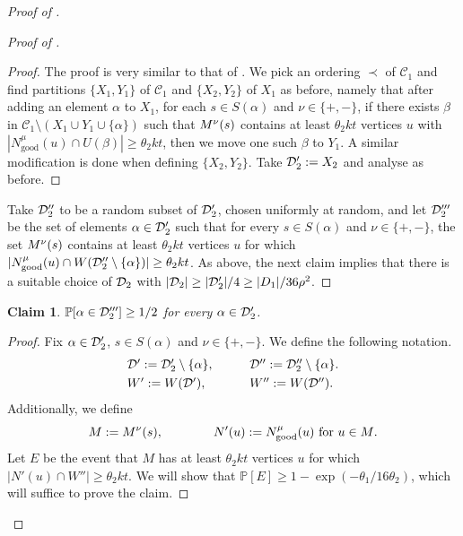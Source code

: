 \documentclass[english]{article}
\theoremstyle{plain}
\newtheorem{claim}[theorem]{Claim}
\theoremstyle{remark}
\def\C{\mathcal{C}}
\def \Nmu{N^{\mu}_{\good}}
\renewcommand{\Pr}{\mathbb{P}}
\DeclareMathOperator{\good}{good}
\begin{document}
\begin{proof}[Proof of ]
\begin{proof}[Proof of ]
				\begin{proof}
					The proof is very similar to that of . We pick an ordering $\prec$ of $\C_1$ and find partitions $\{X_1, Y_1\}$ of $\C_1$ and $\{X_2, Y_2\}$ of $X_1$ as before, namely that after adding an element $\alpha$ to $X_1$, for each $s \in S(\alpha)$ and $\nu \in \{+, -\}$, if there exists $\beta$ in $\C_1 \setminus (X_1 \cup Y_1 \cup \{\alpha\})$ such that $M^{\nu}(s)$ contains at least $\theta_2 kt$ vertices $u$ with $|\Nmu(u) \cap U(\beta)| \ge \theta_2 kt$, then we move one such $\beta$ to $Y_1$.
					A similar modification is done when defining $\{X_2, Y_2\}$.
					Take $\mathcal{D}_2' := X_2$ and analyse as before.
				\end{proof}
				Take $\mathcal{D}_2''$ to be a random subset of $\mathcal{D}_2'$, chosen uniformly at random, and let $\mathcal{D}_2'''$ be the set of elements $\alpha \in \mathcal{D}_2'$ such that for every $s \in S(\alpha)$ and $\nu \in \{+, -\}$, the set $M^{\nu}(s)$ contains at least $\theta_2 kt$ vertices $u$ for which $|\Nmu(u) \cap W(\D_2'' \setminus \{\alpha\})| \ge \theta_2 kt$. 
				As above, the next claim implies that there is a suitable choice of $\mathcal{D}_2$ with $|\mathcal{D}_2| \ge |\mathcal{D}_2'|/4 \ge |D_1|/36\rho^2$.
			\end{proof}

			\begin{claim}
				$\Pr[\alpha \in \D_2'''] \ge 1/2$ for every $\alpha \in \mathcal{D}_2'$.
			\end{claim}

			\begin{proof}

				Fix $\alpha \in \mathcal{D}_2'$, $s \in S(\alpha)$ and $\nu \in \{+, -\}$. 
				We define the following notation.
				\begin{align*}
					\begin{array}{ll}
						\D' := \D_2' \setminus \{\alpha\}, 
						& \qquad \D'' := \D_2'' \setminus \{\alpha\}. \vspace{3pt}\\
						W' := W(\D'),
						& \qquad W'' := W(\D'').
					\end{array}
				\end{align*}
				Additionally, we define
				\begin{align*}
					M := \Mnu(s), 
					\qquad \qquad N'(u) := \Nmu(u) \text{ for $u \in M$}.
				\end{align*}
				Let $E$ be the event that $M$ has at least $\theta_2 kt$ vertices $u$ for which $|N'(u) \cap W''| \ge \theta_2 kt$. We will show that $\Pr[E] \ge 1 - \exp(-\theta_1/16\theta_2)$, which will suffice to prove the claim.


\end{proof}
\end{proof}
\end{document}
